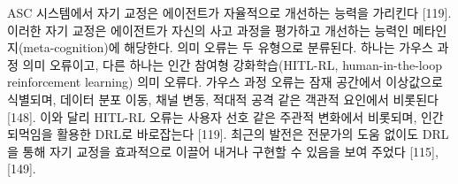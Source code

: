 ASC 시스템에서 자기 교정은 에이전트가 자율적으로 개선하는 능력을 가리킨다 [119].
이러한 자기 교정은 에이전트가 자신의 사고 과정을 평가하고 개선하는 능력인 메타인지(meta-cognition)에 해당한다.
의미 오류는 두 유형으로 분류된다.
하나는 가우스 과정 의미 오류이고, 다른 하나는 인간 참여형 강화학습(HITL-RL, human-in-the-loop reinforcement learning) 의미 오류다.
가우스 과정 오류는 잠재 공간에서 이상값으로 식별되며, 데이터 분포 이동, 채널 변동, 적대적 공격 같은 객관적 요인에서 비롯된다 [148].
이와 달리 HITL-RL 오류는 사용자 선호 같은 주관적 변화에서 비롯되며, 인간 되먹임을 활용한 DRL로 바로잡는다 [119].
최근의 발전은 전문가의 도움 없이도 DRL을 통해 자기 교정을 효과적으로 이끌어 내거나 구현할 수 있음을 보여 주었다 [115], [149].
